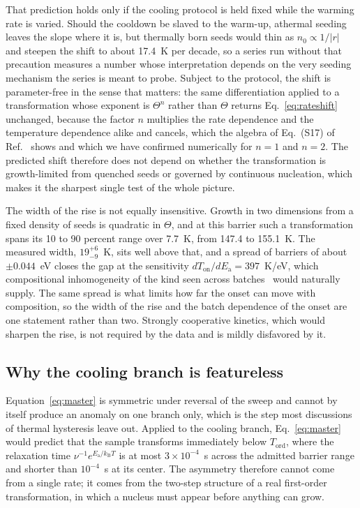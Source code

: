 \documentclass[reprint,twocolumn,prb,amsmath,amssymb,superscriptaddress,floatfix]{revtex4-2}
\newcommand{\kB}{k_{\mathrm{B}}}
\newcommand{\Ea}{E_{\mathrm{a}}}
\newcommand{\Ton}{T_{\mathrm{on}}}
\newcommand{\Tcol}{T_{\mathrm{ord}}}
\begin{document}
That prediction holds only if the cooling protocol is held fixed while the warming rate is
varied. Should the cooldown be slaved to the warm-up, athermal seeding leaves the slope where
it is, but thermally born seeds would thin as $n_{0}\propto1/|r|$ and steepen the shift to about
17.4~K per decade, so a series run without that precaution measures a number whose
interpretation depends on the very seeding mechanism the series is meant to probe. Subject to the
protocol, the shift is parameter-free in the sense that matters: the same differentiation
applied to a transformation whose exponent is $\Theta^{n}$ rather than $\Theta$ returns
Eq.~\eqref{eq:rateshift} unchanged, because the factor $n$ multiplies the rate dependence and
the temperature dependence alike and cancels, which the algebra of Eq.~(S17) of
Ref.~\cite{SM} shows and which we have confirmed numerically for $n=1$ and $n=2$. The predicted
shift therefore does not depend on whether the transformation is growth-limited from quenched
seeds or governed by continuous nucleation, which makes it the sharpest single test of the whole
picture.

The width of the rise is not equally insensitive. Growth in two dimensions from a fixed density
of seeds is quadratic in $\Theta$, and at this barrier such a transformation spans its 10 to 90
percent range over 7.7~K, from 147.4 to 155.1~K. The measured width, $19^{+6}_{-9}$~K, sits well
above that, and a
spread of barriers of about $\pm0.044$~eV closes the gap at the sensitivity
$d\Ton/d\Ea=397$~K/eV, which compositional inhomogeneity of the kind seen across
batches~\cite{RadhaPerspective2021} would naturally supply. The same spread is what limits how
far the onset can move with composition, so the width of the rise and the batch dependence of
the onset are one statement rather than two. Strongly cooperative kinetics, which would sharpen
the rise, is not required by the data and is mildly disfavored by it.

\subsection{Why the cooling branch is featureless}
\label{sec:asymmetry}

Equation~\eqref{eq:master} is symmetric under reversal of the sweep and cannot by itself
produce an anomaly on one branch only, which is the step most discussions of thermal hysteresis
leave out. Applied to the cooling branch,
Eq.~\eqref{eq:master} would predict that the sample transforms immediately below $\Tcol$, where
the relaxation time $\nu^{-1}e^{\Ea/\kB T}$ is at most $3\times10^{-4}$~s across the admitted
barrier range and shorter than $10^{-4}$~s at its center. The asymmetry
therefore cannot come from a single rate; it comes from the two-step structure of a real
first-order transformation, in which a nucleus must appear before anything can grow.
\end{document}
